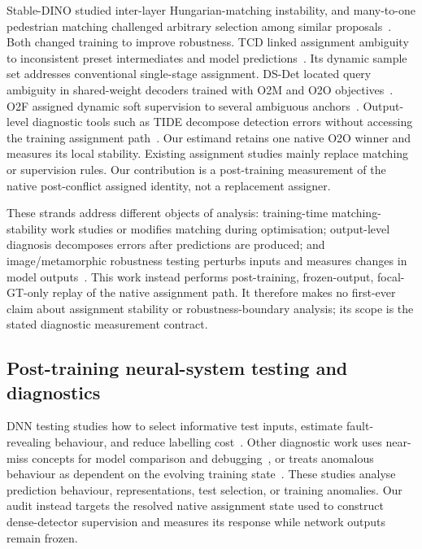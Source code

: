 Stable-DINO studied inter-layer Hungarian-matching instability, and many-to-one pedestrian matching challenged arbitrary selection among similar proposals~\cite{liu2023stablematching,shastry2024favoring}. Both changed training to improve robustness. TCD linked assignment ambiguity to inconsistent preset intermediates and model predictions~\cite{liu2026tcd}. Its dynamic sample set addresses conventional single-stage assignment. DS-Det located query ambiguity in shared-weight decoders trained with O2M and O2O objectives~\cite{cao2025dsdet}. O2F assigned dynamic soft supervision to several ambiguous anchors~\cite{li2023o2f}. Output-level diagnostic tools such as TIDE decompose detection errors without accessing the training assignment path~\cite{bolya2020tide}. Our estimand retains one native O2O winner and measures its local stability. Existing assignment studies mainly replace matching or supervision rules. Our contribution is a post-training measurement of the native post-conflict assigned identity, not a replacement assigner.

These strands address different objects of analysis: training-time matching-stability work studies or modifies matching during optimisation; output-level diagnosis decomposes errors after predictions are produced; and image/metamorphic robustness testing perturbs inputs and measures changes in model outputs~\cite{bolya2020tide,hu2024testoptimization,chen2026gts}. This work instead performs post-training, frozen-output, focal-GT-only replay of the native assignment path. It therefore makes no first-ever claim about assignment stability or robustness-boundary analysis; its scope is the stated diagnostic measurement contract.

\subsection{Post-training neural-system testing and diagnostics}

DNN testing studies how to select informative test inputs, estimate fault-revealing behaviour, and reduce labelling cost~\cite{hu2024testoptimization,chen2026gts}. Other diagnostic work uses near-miss concepts for model comparison and debugging~\cite{kaufman2026nma}, or treats anomalous behaviour as dependent on the evolving training state~\cite{moustakidis2026training}. These studies analyse prediction behaviour, representations, test selection, or training anomalies. Our audit instead targets the resolved native assignment state used to construct dense-detector supervision and measures its response while network outputs remain frozen.
